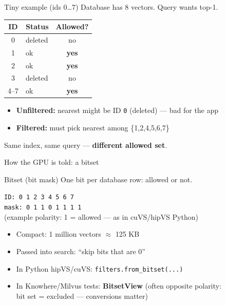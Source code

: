 \documentclass[aspectratio=169,11pt]{beamer}
\begin{document}
\begin{frame}{Tiny example (ids 0\ldots7)}
  \footnotesize
  Database has 8 vectors. Query wants top-1.\\[0.4em]

  \begin{center}
  \begin{tabular}{@{}clc@{}}
    \toprule
    ID & Status & Allowed? \\
    \midrule
    0 & deleted & no \\
    1 & ok & \textbf{yes} \\
    2 & ok & \textbf{yes} \\
    3 & deleted & no \\
    4--7 & ok & \textbf{yes} \\
    \bottomrule
  \end{tabular}
  \end{center}

  \vspace{0.6em}
  \begin{itemize}
    \item \textbf{Unfiltered:} nearest might be ID \texttt{0} (deleted) --- bad for the app
    \item \textbf{Filtered:} must pick nearest among \{1,2,4,5,6,7\}
  \end{itemize}

  \vspace{0.4em}
  Same index, same query --- \textbf{different allowed set}.
\end{frame}

\begin{frame}{How the GPU is told: a bitset}
  \begin{block}{Bitset (bit mask)}
    One bit per database row: allowed or not.
  \end{block}

  \vspace{0.5em}
  \begin{center}
  \texttt{ID:   0 1 2 3 4 5 6 7}\\[0.2em]
  \texttt{mask: 0 1 1 0 1 1 1 1}\\[0.2em]
  {\footnotesize (example polarity: 1 = allowed --- as in cuVS/hipVS Python)}
  \end{center}

  \vspace{0.7em}
  \begin{itemize}
    \item Compact: 1 million vectors $\approx$ 125 KB
    \item Passed into search: ``skip bits that are 0''
    \item In Python hipVS/cuVS: \texttt{filters.from\_bitset(...)}
    \item In Knowhere/Milvus tests: \textbf{BitsetView} (often opposite polarity:\\
          bit set = excluded --- conversions matter)
  \end{itemize}
\end{frame}
\end{document}
